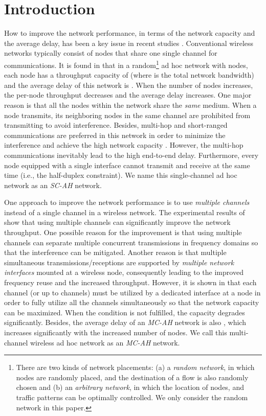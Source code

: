 \documentclass[10pt,journal]{IEEEtran}
\begin{document}
\section{Introduction}
\label{sec:intro}

How to improve the network performance, in terms of the network capacity and the average delay, has been a key issue in recent studies \cite{NLu:TCST14}. Conventional wireless networks typically consist of nodes that share one single channel for communications. It is found in \cite{Gupta:Kumar,gamal:2004,gamal:TIT2006} that in a random\footnote{There are two kinds of network placements: (a) a \textit{random network}, in which  nodes are randomly placed, and the destination of a flow is also randomly chosen and (b) an \textit{arbitrary network}, in which the location of nodes, and traffic patterns can be optimally controlled. We only consider the random network in this paper.} ad hoc network with  nodes, each node has a throughput capacity of  (where  is the total network bandwidth) and the average delay of this network is . When the number of nodes increases, the per-node throughput decreases and the average delay increases. One major reason is that all the nodes within the network share the \textit{same} medium. When a node transmits, its neighboring nodes in the same channel are prohibited from transmitting to avoid interference. Besides, multi-hop and short-ranged communications are preferred in this network in order to minimize the interference and achieve the high network capacity \cite{Gupta:Kumar}. However, the multi-hop communications inevitably lead to the high end-to-end delay. Furthermore, every node equipped with a single interface cannot transmit and receive at the same time (i.e., the half-duplex constraint). We name this single-channel ad hoc network as an \textit{SC-AH} network.

One approach to improve the network performance is to use \textit{multiple channels} instead of a single channel in a wireless network. The experimental results of \cite{Raniwala:infocom2005,So:mobihoc04,Bahl:mobicom2004,Draves:mobicom2004,Kyasanur:mobicom2005,hndai:infocom2008} show that using multiple channels can significantly improve the network throughput. One possible reason for the improvement is that using multiple channels can separate multiple concurrent transmissions in frequency domains so that the interference can be mitigated. Another reason is that multiple simultaneous transmissions/receptions are supported by \textit{multiple network interfaces} mounted at a wireless node, consequently leading to the improved frequency reuse and the increased throughput. However, it is shown in \cite{Gupta:Kumar} \cite{Kyasanur:mobicom2005} that each channel (or up to  channels) must be utilized by a dedicated interface at a node in order to fully utilize all the channels simultaneously so that the network capacity can be maximized. When the condition is not fulfilled, the capacity degrades significantly. Besides, the average delay of an \textit{MC-AH} network is also , which increases significantly with the increased number of nodes. We call this multi-channel wireless ad hoc network as an \textit{MC-AH} network.
\end{document}
